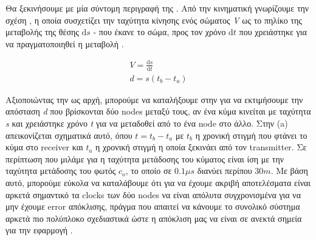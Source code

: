 Θα ξεκινήσουμε με μία σύντομη περιγραφή της . Από την κινηματική γνωρίζουμε την 
σχέση , η οποία συσχετίζει την ταχύτητα κίνησης ενός σώματος \emph{V} ως το πηλίκο της μεταβολής
της θέσης $\mathrm{d}s$ - που έκανε το σώμα, προς τον χρόνο $\mathrm{d}t$ που χρειάστηκε για να πραγματοποιηθεί η μεταβολή \cite{Kinematics}.

\begin{gather}
	V=\frac{\mathrm{d}s}{\mathrm{d}t} \label{eq:speed} \\
	d=s(t_b-t_a) \label{eq:tod-distance}
\end{gather}

Αξιοποιώντας την  ως αρχή, μπορούμε να καταλήξουμε στην  για να εκτιμήσουμε
την απόσταση \emph{d} που βρίσκονται δύο nodes μεταξύ τους, αν ένα κύμα κινείται με ταχύτητα \emph{s} και χρειάστηκε 
χρόνο \emph{t} για να μεταδοθεί από το ένα node στο άλλο. Στην  (a) απεικονίζεται
σχηματικά αυτό, όπου $t=t_b-t_a$ με $t_b$ η χρονική στιγμή που φτάνει το κύμα στο receiver και $t_a$
η χρονική στιγμή η οποία ξεκινάει από τον transmitter. Σε περίπτωση που μιλάμε για  
 η ταχύτητα μετάδοσης του κύματος είναι ίση με την ταχύτητα μετάδοσης του φωτός $c_o$, το οποίο 
σε $0.1μs$ διανύει περίπου $30m$.   
Με βάση αυτό, μπορούμε εύκολα να καταλάβουμε ότι για να έχουμε ακριβή αποτελέσματα είναι αρκετά σημαντικό
τα clocks των δύο nodes να είναι απόλυτα συγχρονισμένα για να μην έχουμε error απόκλισης, πράγμα που
απαιτεί να κάνουμε το συνολικό σύστημα αρκετά πιο πολύπλοκο σχεδιαστικά 
ώστε η απόκλιση μας να είναι σε ανεκτά σημεία για την εφαρμογή \cite{wsn-Localization-systems} \cite{wsn-Localization-techniques}.

